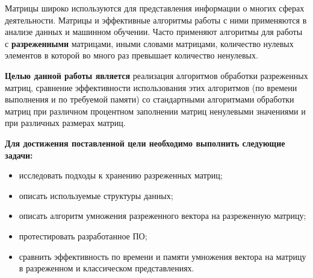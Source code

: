 \Introduction

Матрицы широко используются для представления информации о многих сферах деятельности. Матрицы и эффективные алгоритмы работы с ними применяются в анализе данных и машинном обучении. Часто применяют алгоритмы для работы с \textbf{разреженными} матрицами, иными словами матрицами, количество нулевых элементов в которой во много раз превышает количество ненулевых.

\textbf{Целью данной работы является} реализация алгоритмов обработки разреженных матриц, 
сравнение  эффективности  использования  этих  алгоритмов  (по  времени 
выполнения и по требуемой памяти) со стандартными алгоритмами обработки 
матриц при различном процентном заполнении матриц ненулевыми значениями 
и при различных размерах матриц. 

\textbf{Для достижения поставленной цели необходимо выполнить следующие задачи: }

\begin{itemize}[$\bullet$]
	\item исследовать подходы к хранению разреженных матриц;
	\item описать используемые структуры данных;
	\item описать алгоритм умножения разреженного вектора на разреженную матрицу;
	\item протестировать разработанное ПО;
	\item сравнить эффективность по времени и памяти умножения вектора на матрицу в разреженном и классическом представлениях.
\end{itemize}
